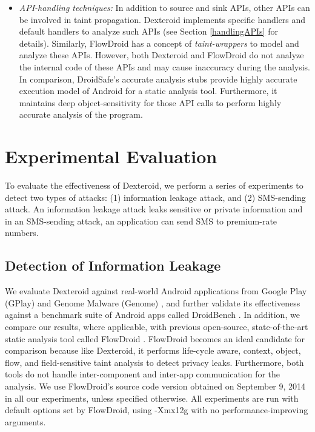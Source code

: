 \documentclass[10pt]{elsarticle}
\begin{document}
\begin{itemize}
\item \emph{API-handling techniques:} In addition to source and sink APIs, other APIs can be involved in taint propagation. Dexteroid implements specific handlers and default handlers to analyze such APIs  (see Section \ref{handlingAPIs} for details). Similarly, FlowDroid has a concept of \emph{taint-wrappers} to model and analyze these APIs. However, both Dexteroid and FlowDroid do not analyze the internal code of these APIs and may cause inaccuracy during the analysis. In comparison, DroidSafe's accurate analysis stubs provide highly accurate execution model of Android for a static analysis tool. Furthermore, it maintains deep object-sensitivity for those API calls to perform highly accurate analysis of the program.

\end{itemize}

\section{Experimental Evaluation}

To evaluate the effectiveness of Dexteroid, we perform a series of experiments to detect two types of attacks: (1) information leakage attack, and (2) SMS-sending attack. An information leakage attack leaks sensitive or private information and in an SMS-sending attack, an application can send SMS to premium-rate numbers. 



\subsection{Detection of Information Leakage}

We evaluate Dexteroid against real-world Android applications from Google Play (GPlay) and Genome Malware (Genome) \cite{dissectingAndroid}, and further validate its effectiveness against a benchmark suite of Android apps called DroidBench \cite{FlowDroid}. In addition, we compare our results, where applicable, with previous open-source, state-of-the-art static analysis tool called FlowDroid \cite{FlowDroid}. FlowDroid becomes an ideal candidate for comparison because like Dexteroid, it performs life-cycle aware, context, object, flow, and field-sensitive taint analysis to detect privacy leaks. Furthermore, both tools do not handle inter-component and inter-app communication for the analysis. We use FlowDroid's source code version \cite{FDWiki} obtained on September 9, 2014 in all our experiments, unless specified otherwise. All experiments are run with default options set by FlowDroid, using {\ttfamily -Xmx12g} with no performance-improving arguments. 
\end{document}
